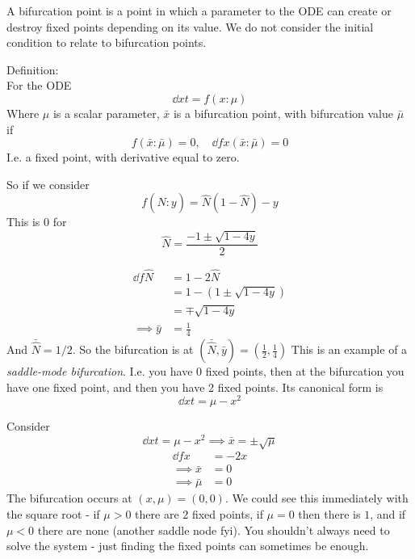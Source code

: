 \documentclass{X:/Documents/Coding/Latex/myassignment}
\begin{document}
A bifurcation point is a point in which a parameter to the ODE can create or destroy fixed points depending on its value. We do not consider the initial condition to relate to bifurcation points.


Definition:\\
For the ODE
\[\dd xt = f(x:\mu)\]
Where $\mu$ is a scalar parameter, $\bar{x}$ is a bifurcation point, with bifurcation value $\bar{\mu}$ 
if
\[f(\bar{x}:\bar{\mu}) = 0,\quad \dd fx (\bar{x}:\bar{\mu})= 0\]
I.e. a fixed point, with derivative equal to zero.

So if we consider
\[f(\hat{N} : y) = \hat{N}(1-\hat{N}) - y\]
This is $0$ for 
\[\hat{N} = \frac{-1\pm \sqrt{1-4y}}{2}\]

\begin{align*}
    \dd f{\hat{N}} &= 1-2\hat{N}\\
    &=1 - (1\pm \sqrt{1-4y})\\
    &= \mp \sqrt{1-4y}\\
    \implies \bar{y}&=\frac14
\end{align*}
And $\bar{\hat{N}} = 1/2$. So the bifurcation is at $(\bar{\hat{N}},\bar{y}) = (\frac12, \frac14)$
This is an example of a \textit{saddle-mode bifurcation}. I.e. you have 0 fixed points, then at the bifurcation you have one fixed point, and then you have 2 fixed points. Its canonical form is
\[\dd xt = \mu - x^2\]

Consider 
\[\dd xt = \mu - x^2 \implies \bar{x} = \pm\sqrt{\mu}\]
\begin{align*}
    \dd fx &= -2x\\
    \implies \bar{x}&=0\\
    \implies \bar{\mu}&=0
\end{align*}
The bifurcation occurs at $(x,\mu) = (0,0)$.
We could see this immediately with the square root - if $\mu>0$ there are 2 fixed points, if $\mu = 0$ then there is $1$, and if $\mu < 0$ there are none (another saddle node fyi). You shouldn't always need to solve the system - just finding the fixed points can sometimes be enough. 
\end{document}
